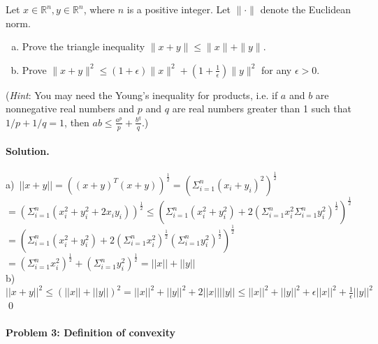 \documentclass[a4paper]{article}
\newenvironment{solution}
{\color{blue} \paragraph{Solution.}}
{\newline \qed}
\begin{document}
\noindent
Let $x\in\mathbb{R}^n,y\in\mathbb{R}^n$, where $n$ is a positive integer. Let $\|\cdot\|$ denote the Euclidean norm.
\begin{enumerate}[a)]
    \item Prove the triangle inequality $\|x+y\|\leq\|x\|+\|y\|$.
    \item Prove $\|x+y\|^2\leq(1+\epsilon)\|x\|^2+(1+\frac{1}{\epsilon})\|y\|^2$ for any $\epsilon>0$.
\end{enumerate}
(\emph{Hint}: You may need the Young's inequality for products, i.e. if $a$ and $b$ are nonnegative real numbers and $p$ and $q$ are real numbers greater than 1 such that $1/p+1/q=1$, then $ab\leq\frac{a^p}{p}+\frac{b^q}{q}$.)
\begin{solution}
    a)\ $||x+y|| = ((x+y)^T(x+y))^{\frac{1}{2}} = (\Sigma_{i=1}^{n}(x_i + y_i)^2)^{\frac{1}{2}}$\\
    $= (\Sigma_{i=1}^{n}(x_i^2 + y_i^2 + 2x_iy_i))^{\frac{1}{2}} \leq (\Sigma_{i=1}^{n}(x_i^2 + y_i^2) + 2(\Sigma_{i=1}^{n}x_i^2\Sigma_{i=1}^{n}y_i^2)^{\frac{1}{2}})^{\frac{1}{2}}$\\
    $= (\Sigma_{i=1}^{n}(x_i^2 + y_i^2) + 2(\Sigma_{i=1}^{n}x_i^2)^{\frac{1}{2}}(\Sigma_{i=1}^{n}y_i^2)^{\frac{1}{2}})^{\frac{1}{2}}$\\
    $= (\Sigma_{i=1}^{n}x_i^2)^{\frac{1}{2}} + (\Sigma_{i=1}^{n}y_i^2)^{\frac{1}{2}} = ||x|| + ||y||$\\
    b)\ $||x+y||^2 \leq (||x|| + ||y||)^2 = ||x||^2 + ||y||^2 + 2||x||||y|| \leq ||x||^2 + ||y||^2 + \epsilon ||x||^2 + \frac{1}{\epsilon} ||y||^2$
\end{solution}

\paragraph{Problem 3: Definition of convexity}
~\\
\end{document}
